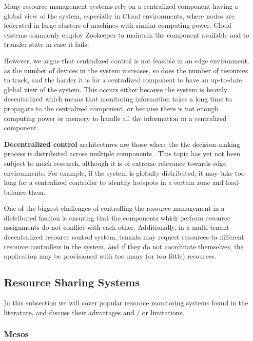 Many resource management systems rely on a centralized component having a global view of the system, especially in Cloud environments, where nodes are federated in large clusters of machines with similar computing power. Cloud systems commonly employ Zookeeper \cite{hunt2010zookeeper} to maintain the component available and to transfer state in case it fails.

However, we argue that centralized control is not feasible in an edge environment, as the number of devices in the system increases, so does the number of resources to track, and the harder it is for a centralized component to have an up-to-date global view of the system. This occurs either because the system is heavily decentralized which means that monitoring information takes a long time to propagate to the centralized component, or because there is not enough computing power or memory to handle all the information in a centralized component.

\textbf{Decentralized control} architectures are those where the the decision-making process is distributed across multiple components \cite{Hong2019}. This topic has yet not been subject to much research, although it is of extreme relevance towards edge environments. For example, if the system is globally distributed, it may take too long for a centralized controller to identify hotspots in a certain zone and load-balance them.

One of the biggest challenges of controlling the resource management in a distributed fashion is ensuring that the components which perform resource assignments do not conflict with each other. Additionally, in a multi-tenant decentralized resource control system, tenants may request resources to different resource controllers in the system, and if they do not coordinate themselves, the application may be provisioned with too many (or too little) resources.

\subsection{Resource Sharing Systems}

In this subsection we will cover popular resource monitoring systems found in the literature, and discuss their advantages and / or limitations.

\subsubsection{Mesos}

